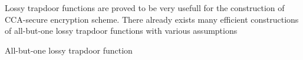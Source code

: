 Lossy trapdoor functions are proved to be very usefull for the construction of CCA-secure encryption scheme. 
There already exists many efficient constructions of all-but-one lossy trapdoor functions with various assumptions~\cite{DBLP:journals/siamcomp/PeikertW11, DBLP:conf/crypto/BoldyrevaFO08}

\begin{section}{All-but-one lossy trapdoor function}

\end{section}
